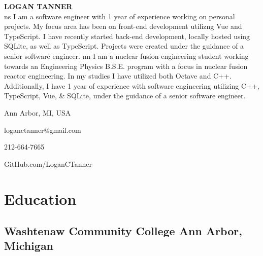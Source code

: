 \documentclass[10pt]{article} %
\newcommand\profSumFlag{n}
\newcommand\profSum[1]{
    \if \profSumFlag s 
        {
            I am a software engineer with 1 year of experience working on personal 
            projects. My focus area has been on front-end development utilizng
            Vue and TypeScript. I have recently started back-end development, locally
            hosted using SQLite, as well as TypeScript. Projects were created under 
            the guidance of a senior software engineer. 
        }
    \fi
    \if \profSumFlag n
        {
            I am a nuclear fusion engineering student working towards an Engineering 
            Physics B.S.E. program with a focus in nuclear fusion reactor 
            engineering. In my studies I have utilized both Octave and C++. 
            Additionally, I have 1 year of experience with software engineering 
            utilizing C++, TypeScript, Vue, \& SQLite, under the guidance of a 
            senior software engineer.
        }        
    \fi
}
\begin{document}
\begin{center}
    \begin{minipage}{0.55\textwidth}
        {\huge\bfseries
            LOGAN TANNER
        } \\ 
        \profSum \\ \medskip
    \end{minipage} \hfill
    \begin{minipage}{0.4\textwidth}
        \raggedleft
        \begin{description}[style=multiline, leftmargin=2cm]
            \item[Residence] Ann Arbor, MI, USA
            \item[Email] loganctanner@gmail.com
            \item[Mobile] 212-664-7665
            \item[GitHub] GitHub.com/LoganCTanner
        \end{description}
    \end{minipage}
\end{center}

\section{Education}
\subsection{Washtenaw Community College \hfill Ann Arbor, Michigan}
\end{document}
